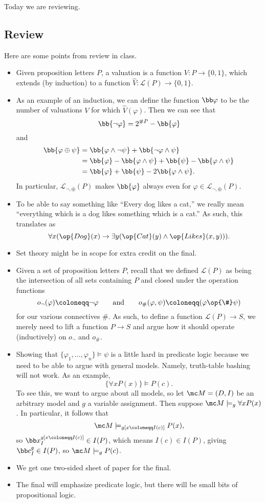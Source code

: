 
Today we are reviewing.

\subsection{Review}
Here are some points from review in class.
\begin{itemize}
	\item Given proposition letters $P$, a valuation is a function $V\colon P\to\{0,1\}$, which extends (by induction) to a function $\hat V\colon\mathcal L(P)\to\{0,1\}$.
	\item As an example of an induction, we can define the function $\bb\varphi$ to be the number of valuations $V$ for which $\hat V(\varphi)$. Then we can see that
	\[\bb{\lnot\varphi}=2^{\#P}-\bb{\varphi}\]
	and
	\begin{align*}
		\bb{\varphi\oplus\psi} &= \bb{\varphi\land\lnot\psi}+\bb{\lnot\varphi\land\psi} \\
		&= \bb{\varphi}-\bb{\varphi\land\psi}+\bb{\psi}-\bb{\varphi\land\psi} \\
		&= \bb{\varphi}+\bb{\psi}-2\bb{\varphi\land\psi}.
	\end{align*}
	In particular, $\mathcal L_{\lnot,\oplus}(P)$ makes $\bb{\varphi}$ always even for $\varphi\in\mathcal L_{\lnot,\oplus}(P)$.
	\item To be able to say something like ``Every dog likes a cat,'' we really mean ``everything which is a dog likes something which is a cat.'' As such, this translates as
	\[\forall x(\op{Dog}(x)\to\exists y(\op{Cat}(y)\land\op{Likes}(x,y))).\]
	\item Set theory might be in scope for extra credit on the final.
	\item Given a set of proposition letters $P$, recall that we defined $\mathcal L(P)$ as being the intersection of all sets containing $P$ and closed under the operation functions
	\[o_\lnot(\varphi)\coloneqq\lnot\varphi\qquad\text{and}\qquad o_\#(\varphi,\psi)\coloneqq(\varphi\op{\#}\psi)\]
	for our various connectives $\#$. As such, to define a function $\mathcal L(P)\to S$, we merely need to lift a function $P\to S$ and argue how it should operate (inductively) on $o_\lnot$ and $o_\#$.
	\item Showing that $\{\varphi_1,\ldots,\varphi_n\}\models\psi$ is a little hard in predicate logic because we need to be able to argue with general models. Namely, truth-table bashing will not work. As an example,
	\[\{\forall xP(x)\}\models P(c).\]
	To see this, we want to argue about all models, so let $\mc M=(D,I)$ be an arbitrary model and $g$ a variable assignment. Then suppose $\mc M\models_g\forall xP(x)$. In particular, it follows that
	\[\mc M\models_{g[x\coloneqq I(c)]}P(x),\]
	so $\bb x^{g[x\coloneqq I(c)]}_I\in I(P)$, which means $I(c)\in I(P)$, giving $\bb c^g_I\in I(P)$, so $\mc M\models_gP(c)$.
	\item We get one two-sided sheet of paper for the final.
	\item The final will emphasize predicate logic, but there will be small bits of propositional logic.
\end{itemize}

